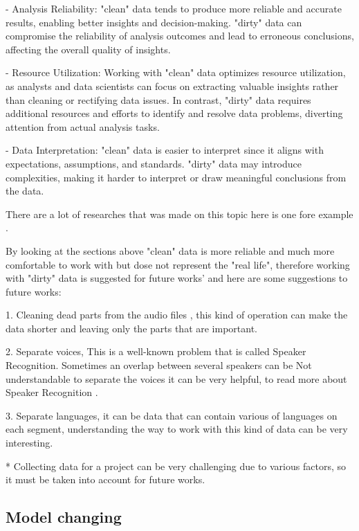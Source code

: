 \documentclass[a4paper]{article}
\begin{document}
- Analysis Reliability: "clean" data tends to produce more reliable and accurate results, enabling better insights and decision-making. "dirty" data can compromise the reliability of analysis outcomes and lead to erroneous conclusions, affecting the overall quality of insights.

- Resource Utilization: Working with "clean" data optimizes resource utilization, as analysts and data scientists can focus on extracting valuable insights rather than cleaning or rectifying data issues. In contrast, "dirty" data requires additional resources and efforts to identify and resolve data problems, diverting attention from actual analysis tasks.

- Data Interpretation: "clean" data is easier to interpret since it aligns with expectations, assumptions, and standards. "dirty" data may introduce complexities, making it harder to interpret or draw meaningful conclusions from the data.

There are a lot of researches that was made on this topic here is one fore example \cite{porwal2013comparative}.

By looking at the sections above "clean" data is more reliable and much more comfortable to work with but dose not represent the "real life", therefore working with "dirty" data is suggested for future works' and here are some suggestions to future works: 

1. Cleaning dead parts from the audio files , this kind of operation can make the data shorter and leaving only the parts that are important.

2. Separate voices, This is a well-known problem that is called Speaker Recognition. Sometimes an overlap between several speakers can be Not understandable to separate the voices it can be very helpful, to read more about Speaker Recognition \cite{campbell1997speaker}.

3. Separate languages, it can be data that can contain various of languages on each segment, understanding the way to work with this kind of data can be very interesting.\newline

* Collecting data for a project can be very challenging due to various factors, so it must be taken into account for future works.

\subsection{Model changing}
\end{document}

